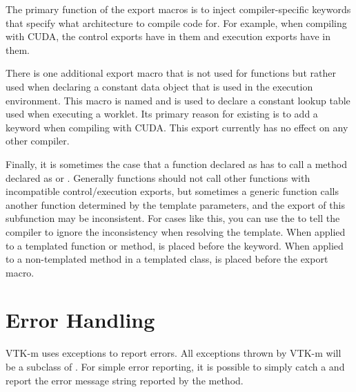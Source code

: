 
The primary function of the export macros is to inject compiler-specific
keywords that specify what architecture to compile code for. For example,
when compiling with CUDA, the control exports have
 in them and execution exports
have  in them.

There is one additional export macro that is not used for functions but
rather used when declaring a constant data object that is used in the
execution environment. This macro is named
and is used to declare a constant lookup table used when executing a
worklet. Its primary reason for existing is to add a
 keyword when compiling with CUDA. This export
currently has no effect on any other compiler.

Finally, it is sometimes the case that a function declared as
\vtkmexeccontexport has to call a method declared as \vtkmexecexport or
\vtkmcontexport. Generally functions should not call other functions with
incompatible control/execution exports, but sometimes a generic
\vtkmexeccontexport function calls another function determined by the
template parameters, and the export of this subfunction may be
inconsistent. For cases like this, you can use the
 to tell the compiler to ignore the
inconsistency when resolving the template. When applied to a templated
function or method,  is placed
before the  keyword. When applied to a non-templated
method in a templated class,  is
placed before the export macro.


\section{Error Handling}
\label{sec:ErrorHandlingControl}


VTK-m uses exceptions to report errors. All exceptions thrown by VTK-m will
be a subclass of . For simple error reporting, it is
possible to simply catch a  and report the error message
string reported by the  method.

